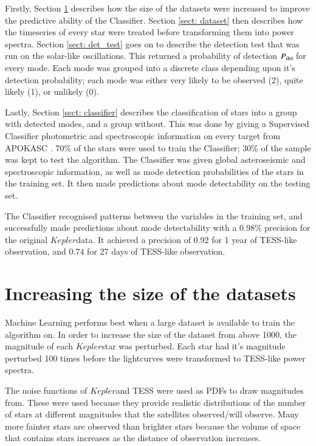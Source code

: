 \documentclass[a4paper,fleqn,usenatbib,useAMS]{mnras}
\newcommand{\kep}{\ensuremath{Kepler}\:}
\newcommand{\pdet}{\ensuremath{P_{\rm det}\:}}
\begin{document}
Firstly, Section \ref{sect: size} describes how the size of the datasets were increased to improve the predictive ability of the Classifier. Section \ref{sect: dataset} then describes how the timeseries of every star were treated before transforming them into power spectra. Section \ref{sect: det_test} goes on to describe the detection test that was run on the solar-like oscillations. This returned a probability of detection \pdet for every mode. Each mode was grouped into a discrete class depending upon it's detection probability; each mode was either very likely to be observed (2), quite likely (1), or unlikely (0).

Lastly, Section \ref{sect: classifier} describes the classification of stars into a group with detected modes, and a group without. This was done by giving a Supervised Classifier photometric and spectroscopic information on every target from APOKASC \citep{pinsonneault_apokasc_2014}. 70\% of the stars were used to train the Classifier; 30\% of the sample was kept to test the algorithm. The Classifier was given global asteroseismic and spectroscopic information, as well as mode detection probabilities of the stars in the training set. It then made predictions about mode detectability on the testing set.

The Classifier recognised patterns between the variables in the training set, and successfully made predictions about mode detectability with a 0.98\% precision for the original \kep data. It achieved a precision of 0.92 for 1 year of TESS-like observation, and 0.74 for 27 days of TESS-like observation.



\section{Increasing the size of the datasets}
\label{sect: size}

Machine Learning performs best when a large dataset is available to train the algorithm on. In order to increase the size of the dataset from \citet{davies_asteroseismology_2016} above 1000, the magnitude of each \kep star was perturbed. Each star had it's magnitude perturbed 100 times before the lightcurves were transformed to TESS-like power spectra. 

The noise functions of \kep and TESS were used as PDFs to draw magnitudes from. These were used because they provide realistic distributions of the number of stars at different magnitudes that the satellites observed/will observe. Many more fainter stars are observed than brighter stars because the volume of space that contains stars increases as the distance of observation increases.
\end{document}
